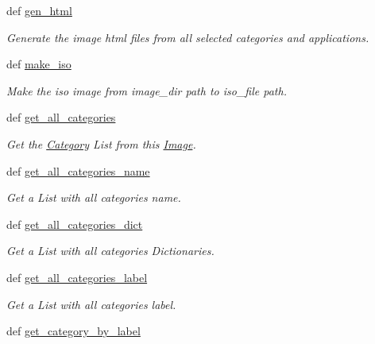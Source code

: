 \begin{CompactItemize}
def \hyperlink{classwinsollib_1_1Image_8540f035639495266049a6a31a6075eb}{gen\_\-html}
\begin{CompactList}\small\item\em Generate the image html files from all selected categories and applications. \item\end{CompactList}\item 
def \hyperlink{classwinsollib_1_1Image_28f8bc77b1f1637445b41b14d448134f}{make\_\-iso}
\begin{CompactList}\small\item\em Make the iso image from {\em image\_\-dir\/} path to {\em iso\_\-file\/} path. \item\end{CompactList}\item 
def \hyperlink{classwinsollib_1_1Image_6ed36dc88fffd97bb08f117e1f25cae2}{get\_\-all\_\-categories}
\begin{CompactList}\small\item\em Get the \hyperlink{classwinsollib_1_1Category}{Category} List from this \hyperlink{classwinsollib_1_1Image}{Image}. \item\end{CompactList}\item 
def \hyperlink{classwinsollib_1_1Image_293056786159491affe2334261daf6ea}{get\_\-all\_\-categories\_\-name}
\begin{CompactList}\small\item\em Get a List with all categories name. \item\end{CompactList}\item 
def \hyperlink{classwinsollib_1_1Image_5e6a3c2026c6b95c06295d7ead468821}{get\_\-all\_\-categories\_\-dict}
\begin{CompactList}\small\item\em Get a List with all categories Dictionaries. \item\end{CompactList}\item 
def \hyperlink{classwinsollib_1_1Image_785563288902ba88aa4d14109b32c967}{get\_\-all\_\-categories\_\-label}
\begin{CompactList}\small\item\em Get a List with all categories label. \item\end{CompactList}\item 
def \hyperlink{classwinsollib_1_1Image_b6f7508c0bd78f4a8d08bb7d9f4d49f8}{get\_\-category\_\-by\_\-label}

\end{CompactItemize}
